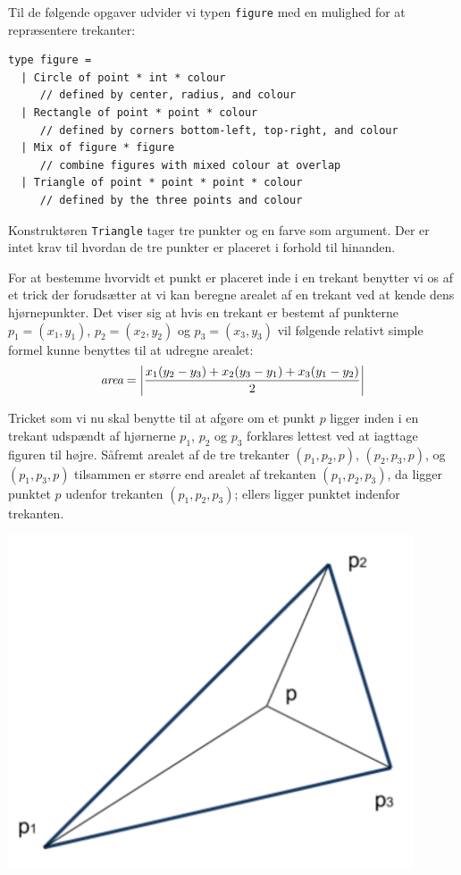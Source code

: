 Til de følgende opgaver udvider vi typen \texttt{figure} med en mulighed for at repræsentere trekanter:

\begin{lstlisting}[numbers=none,frame=none,mathescape]
type figure =
  | Circle of point * int * colour
     // defined by center, radius, and colour
  | Rectangle of point * point * colour
     // defined by corners bottom-left, top-right, and colour
  | Mix of figure * figure
     // combine figures with mixed colour at overlap
  | Triangle of point * point * point * colour
     // defined by the three points and colour
\end{lstlisting}

\noindent
Konstruktøren \texttt{Triangle} tager tre punkter og en farve som
argument. Der er intet krav til hvordan de tre punkter er placeret i
forhold til hinanden.

For at bestemme hvorvidt et punkt er placeret inde i en trekant
benytter vi os af et trick der forudsætter at vi kan beregne arealet
af en trekant ved at kende dens hjørnepunkter. Det viser sig at hvis
en trekant er bestemt af punkterne $p_1=(x_1,y_1)$, $p_2=(x_2,y_2)$ og
$p_3=(x_3,y_3)$ vil følgende relativt simple formel kunne benyttes til
at udregne arealet:
\[
\emph{area} = \left | \dfrac{x_1(y_2-y_3) + x_2(y_3-y_1) + x_3(y_1-y_2)}{2} \right |
\]

\begin{minipage}{.62\textwidth}

  Tricket som vi nu skal benytte til at afgøre om et punkt $p$ ligger
  inden i en trekant udspændt af hjørnerne $p_1$, $p_2$ og $p_3$
  forklares lettest ved at iagttage figuren til højre. Såfremt arealet
  af de tre trekanter $(p_1, p_2, p)$, $(p_2,p_3,p)$, og $(p_1,p_3,p)$
  tilsammen er større end arealet af trekanten $(p_1,p_2,p_3)$, da
  ligger punktet $p$ udenfor trekanten $(p_1,p_2,p_3)$; ellers ligger
  punktet indenfor trekanten.

\end{minipage} \hfill \begin{minipage}{.35\textwidth}
\includegraphics[width=0.9\textwidth]{triarea.png}
\end{minipage}

